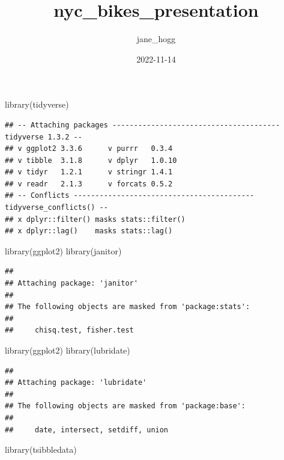 \documentclass[
]{article}
\title{nyc\_bikes\_presentation}
\author{jane\_hogg}
\date{2022-11-14}
\newenvironment{Shaded}{\begin{snugshade}}{\end{snugshade}}
\newcommand{\FunctionTok}[1]{\textcolor[rgb]{0.00,0.00,0.00}{#1}}
\newcommand{\NormalTok}[1]{#1}
\begin{document}
\maketitle

\begin{Shaded}
\begin{Highlighting}[]
\FunctionTok{library}\NormalTok{(tidyverse)}
\end{Highlighting}
\end{Shaded}

\begin{verbatim}
## -- Attaching packages --------------------------------------- tidyverse 1.3.2 --
## v ggplot2 3.3.6      v purrr   0.3.4 
## v tibble  3.1.8      v dplyr   1.0.10
## v tidyr   1.2.1      v stringr 1.4.1 
## v readr   2.1.3      v forcats 0.5.2 
## -- Conflicts ------------------------------------------ tidyverse_conflicts() --
## x dplyr::filter() masks stats::filter()
## x dplyr::lag()    masks stats::lag()
\end{verbatim}

\begin{Shaded}
\begin{Highlighting}[]
\FunctionTok{library}\NormalTok{(ggplot2)}
\FunctionTok{library}\NormalTok{(janitor)}
\end{Highlighting}
\end{Shaded}

\begin{verbatim}
## 
## Attaching package: 'janitor'
## 
## The following objects are masked from 'package:stats':
## 
##     chisq.test, fisher.test
\end{verbatim}

\begin{Shaded}
\begin{Highlighting}[]
\FunctionTok{library}\NormalTok{(ggplot2)}
\FunctionTok{library}\NormalTok{(lubridate)}
\end{Highlighting}
\end{Shaded}

\begin{verbatim}
## 
## Attaching package: 'lubridate'
## 
## The following objects are masked from 'package:base':
## 
##     date, intersect, setdiff, union
\end{verbatim}

\begin{Shaded}
\begin{Highlighting}[]
\FunctionTok{library}\NormalTok{(tsibbledata)}
\end{Highlighting}
\end{Shaded}
\end{document}

